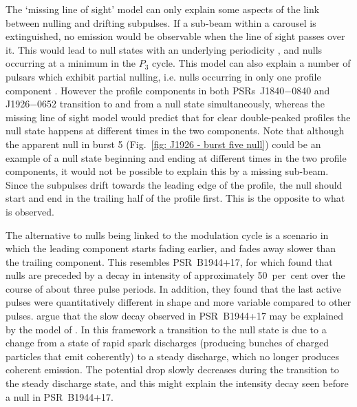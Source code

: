 The `missing line of sight' model can only explain some aspects of the link between nulling and drifting subpulses. If a sub-beam within a carousel is extinguished, no emission would be observable when the line of sight passes over it. This would lead to null states with an underlying periodicity \citep{HRxx2007, HRxx2009}, and nulls occurring at a minimum in the $P_3$ cycle. This model can also explain a number of pulsars which exhibit partial nulling, i.e. nulls occurring in only one profile component \citep{LAxx1983, Vxxx1995,LKR+2002,JLxx2004}. However the profile components in both PSRs~J1840$-$0840 and J1926$-$0652 transition to and from a null state simultaneously, whereas the missing line of sight model would predict that for clear double-peaked profiles the null state happens at different times in the two components. Note that although the apparent null in burst 5 (Fig.~\ref{fig: J1926 - burst five null}) could be an example of a null state beginning and ending at different times in the two profile components, it would not be possible to explain this by a missing sub-beam. Since the subpulses drift towards the leading edge of the profile, the null should start and end in the trailing half of the profile first. This is the opposite to what is observed.

The alternative to nulls being linked to the modulation cycle is a scenario in which the leading component starts fading earlier, and fades away slower than the trailing component. This resembles PSR~B1944+17, for which \citet{DCHR1986} found that nulls are preceded by a decay in intensity of approximately 50~per~cent over the course of about three pulse periods. In addition, they found that the last active pulses were quantitatively different in shape and more variable compared to other pulses. \citet{DCHR1986} argue that the slow decay observed in PSR~B1944+17 may be explained by the model of \citet{FRxx1982}. In this framework a transition to the null state is due to a change from a state of rapid spark discharges (producing bunches of charged particles that emit coherently) to a steady discharge, which no longer produces coherent emission. The potential drop slowly decreases during the transition to the steady discharge state, and this might explain the intensity decay seen before a null in PSR~B1944+17.

